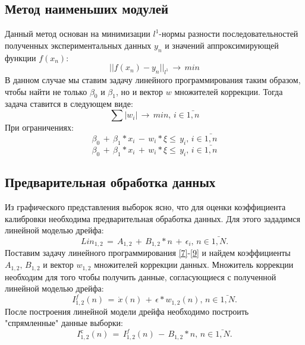 \subsection{Метод наименьших модулей}
\begin{flushleft}
	Данный метод основан на минимизации $l^1$-нормы разности последовательностей полученных экспериментальных данных ${y_n}$ и значений аппроксимирующей функции $f({x_n})$:
	\begin{equation}
		||f({x_n})-{y_n}||_{l^1}\,\rightarrow\, min
		\label{6}
	\end{equation}
	В данном случае мы ставим задачу линейного программирования таким образом, чтобы найти не только $\beta_{0}$ и $\beta_{1}$, но и вектор $w$ множителей коррекции. Тогда задача ставится в следующем виде:
	\begin{equation}
		\sum|w_i|\,\rightarrow\, min, \, i \in \bar{1,n}
		\label{7}
	\end{equation}
	При ограничениях:
	\begin{equation}
		\beta_{0}\,+\,\beta_{1}*x_i \,-\, w_i*\xi \leq\, y_i, \, i \in \bar{1,n}
		\label{8}
	\end{equation}
	\begin{equation}
		\beta_{0}\,+\,\beta_{1}*x_i \,+\, w_i*\xi \leq\, y_i, \, i \in \bar{1,n}
		\label{9}
	\end{equation}
\end{flushleft}

\subsection{Предварительная обработка данных}
\begin{flushleft}
	Из графического представления выборок ясно, что для оценки коэффициента калибровки необходима предварительная обработка данных. Для этого зададимся линейной моделью дрейфа:
	\begin{equation}
		Lin_{1,2} \,=\, A_{1,2}\,+\, B_{1,2}*n \,+\,\epsilon_{i}, \, n\in \bar{1,N}.
		\label{10}
	\end{equation}
	Поставим задачу линейного программирования \ref{7}-\ref{9} и найдем коэффициенты $A_{1,2},\, B_{1,2}$ и вектор $w_{1,2}$ множителей коррекции данных. Множитель коррекции необходим для того чтобы получить данные, согласующиеся с полученной линейной моделью дрейфа:
	\begin{equation}
 		I_{1,2}^f(n) \,=\, \dot{x}(n) \,+\,\epsilon*w_{1,2}(n), \, n\in \bar{1,N}.
	 	\label{11}
	\end{equation}
 	После построения линейной модели дрейфа необходимо построить "спрямленные" данные выборки:
 	\begin{equation}
 		I_{1,2}^{с}(n) \,=\, I_{1,2}^f(n) \,-\, B_{1,2}*n, \, n\in \bar{1,N}.
 		\label{12}
 	\end{equation}
\end{flushleft}

